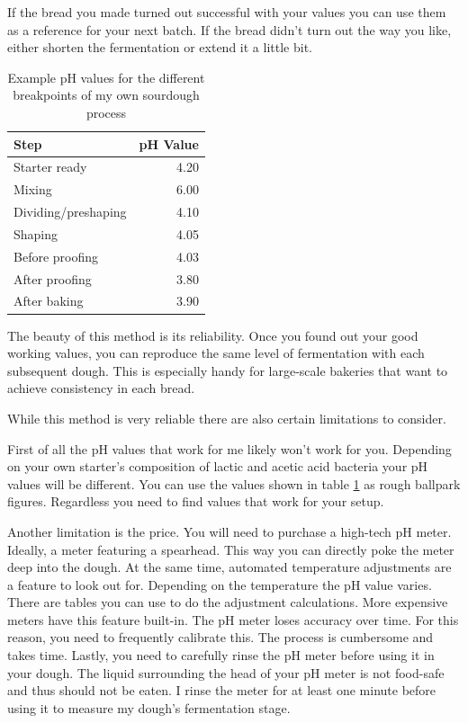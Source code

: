 If the bread you made turned out successful with your values
you can use them as a reference for your next batch. If the
bread didn't turn out the way you like, either shorten
the fermentation or extend it a little bit.

\begin{table}[!htb]
  \begin{tabular}{|l|r|}
  \hline
  \textbf{Step}       & \multicolumn{1}{l|}{\textbf{pH Value}} \\ \hline
  Starter ready       & 4.20                                   \\ \hline
  Mixing              & 6.00                                   \\ \hline
  Dividing/preshaping & 4.10                                   \\ \hline
  Shaping             & 4.05                                   \\ \hline
  Before proofing     & 4.03                                   \\ \hline
  After proofing      & 3.80                                   \\ \hline
  After baking        & 3.90                                   \\ \hline
  \end{tabular}
  \caption{Example pH values for the different breakpoints of my own sourdough process}
  \label{table:sample-ph-values}
\end{table}

The beauty of this method is its reliability. Once you found
out your good working values, you can reproduce
the same level of fermentation with each subsequent dough.
This is especially handy for large-scale bakeries that want
to achieve consistency in each bread.

While this method is very reliable there are also certain
limitations to consider.

First of all the pH values that work for me likely won't work for
you. Depending on your own starter's composition of lactic
and acetic acid bacteria your pH values will be different.
You can use the values shown in table \ref{table:sample-ph-values}
as rough ballpark figures. Regardless you need to find values
that work for your setup.

Another limitation is the price. You will need to purchase
a high-tech pH meter. Ideally, a meter featuring a spearhead.
This way you can directly poke the meter deep into the dough.
At the same time, automated temperature adjustments are a
feature to look out for. Depending on the temperature
the pH value varies. There are tables you can use to
do the adjustment calculations. More expensive meters
have this feature built-in. The pH meter loses accuracy
over time. For this reason, you need to frequently
calibrate this. The process is cumbersome and takes time.
Lastly, you need to carefully rinse the pH meter before
using it in your dough. The liquid surrounding the
head of your pH meter is not food-safe and thus should
not be eaten. I rinse the meter for at least one minute
before using it to measure my dough's fermentation stage.


